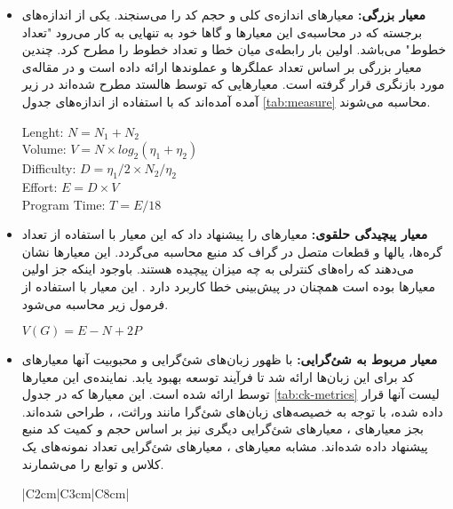 \begin{itemize}
	\item \textbf{معیار بزرگی: }
معیارهای  اندازه‌ی کلی و حجم کد را می‌سنجند. یکی از اندازه‌های برجسته که در محاسبه‌ی این معیارها و گاها خود به تنهایی به کار می‌رود "تعداد خطوط" می‌باشد. اولین بار 
 \cite{akiyama1971example}  
رابطه‌ی میان خطا و تعداد خطوط را مطرح کرد. 
 \cite{halstead1977elements} 
 چندین معیار بزرگی بر اساس  تعداد عملگرها و عملوند‌ها ارائه داده است و در مقاله‌ی \cite{pawade2016exploring} مورد بازنگری قرار گرفته است. معیارهایی که توسط هالستد مطرح شده‌اند در زیر آمده آمده‌اند که با استفاده از اندازه‌های جدول \ref{tab:measure} محاسبه می‌شوند. 
 \begin{latin}
 \baselineskip=1.1cm
Lenght: $N = N_1 + N_2$ \\
Volume: $V = N \times log_2 (\eta_1 + \eta_2)$\\
Difficulty: $D = \eta_1/2 \times N_2/\eta_2$ \\
Effort: $E = D \times V$ \\
Program Time: $T = E/18$ \\
 \end{latin}
 
 
\item \textbf{معیار پیچیدگی حلقوی: }
 معیارهای 
را پیشنهاد داد که این معیار با استفاده از تعداد گره‌ها، یالها و قطعات متصل در گراف   کد منبع محاسبه می‌گردد\cite{mccabe1976complexity}. این معیارها نشان می‌دهند که راه‌های کنترلی به چه میزان پیچیده هستند. باوجود اینکه جز اولین معیارها بوده است همچنان در پیش‌بینی خطا کاربرد دارد \cite{malhotra2014comparative}. این معیار  با استفاده از فرمول زیر محاسبه می‌شود. \\
\begin{latin}
$V(G) = E - N + 2P $
\end{latin}


\item \textbf{معیار مربوط به شئ‌گرایی: }
با ظهور زبان‌های شئ‌گرایی و محبوبیت آنها معیارهای کد  برای این زبان‌ها ارائه شد تا فرآیند توسعه بهبود یابد. نماینده‌ی این معیارها توسط  
 ارائه شده است\cite{chidamber1994metrics}. این معیارها  که در جدول  \ref{tab:ck-metrics} لیست آنها قرار داده شده، با توجه به خصیصه‌های زبان‌های شئ‌گرا مانند وراثت، ،  طراحی شده‌اند. بجز معیارهای  ، معیارهای شئ‌گرایی دیگری نیز بر اساس حجم و کمیت کد منبع پیشنهاد داده شده‌اند. مشابه معیارهای ، معیارهای شئ‌گرایی تعداد نمونه‌های یک کلاس و توابع را می‌شمارند. \\
 \begin{table}[H] 
 	\renewcommand*{\arraystretch}{1.5}	
 	\centering \caption{معیارهای CK }
 	\label{tab:ck-metrics}
 	\begin{tabular}{|C{2cm}|C{3cm}|C{8cm}|}
 		

\end{tabular}
\end{table}
\end{itemize}
